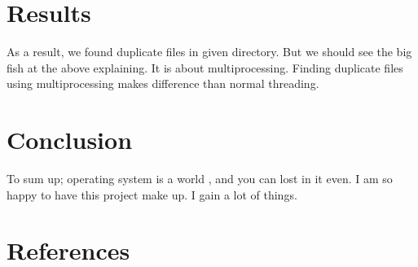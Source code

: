 \documentclass[onecolumn]{article}
\begin{document}
\section{Results}

As a result, we found duplicate files in given directory. But we should see the big fish at the above explaining. It is about multiprocessing. Finding duplicate files using multiprocessing makes difference than normal threading.


\section{Conclusion}

To sum up; operating system is a world , and you can lost in it even. I am so happy to have this project make up. I gain a lot of things.  

\section{References}
\end{document}
